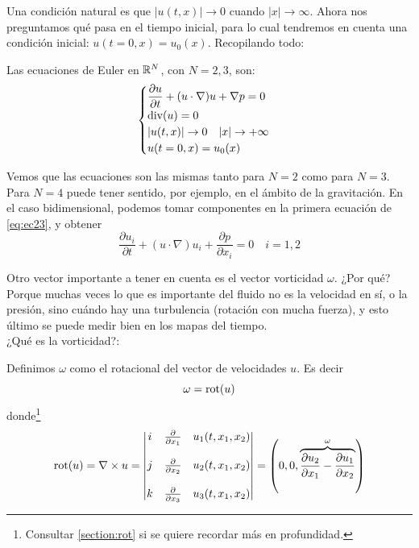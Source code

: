 Una condición natural es que $|u(t,x)| \to 0$ cuando $|x| \to \infty$. Ahora nos preguntamos qué pasa en el tiempo inicial, para lo cual
tendremos en cuenta una condición inicial: $u(t=0,x) = u_0(x)$. Recopilando todo:

\begin{definicion}
    Las ecuaciones de Euler en $\mathbb{R}^N$, con $N=2,3$, son:
    \begin{equation}\label{eq:ec23}
        \begin{cases}
            \dfrac{\partial u}{\partial t} + (u \cdot \nabla) u + \nabla p = 0 \\
            \text{div}(u) = 0 \\
            |u(t,x)| \to 0 \quad |x| \to +\infty \\
            u(t=0,x) = u_0(x)
        \end{cases}
    \end{equation}
\end{definicion}

\begin{observacion}
    Vemos que las ecuaciones son las mismas tanto para $N=2$ como para $N=3$. Para $N=4$ puede tener sentido, por ejemplo, en el ámbito de la gravitación.
    En el caso bidimensional, podemos tomar componentes en la primera ecuación de \eqref{eq:ec23}, y obtener
    \begin{equation}
        \dfrac{\partial u_i}{\partial t} + (u \cdot \nabla) u_i + \dfrac{\partial p}{\partial x_i} = 0 \quad i=1,2
    \end{equation}
\end{observacion}

Otro vector importante a tener en cuenta es el vector vorticidad $\omega$. ¿Por qué? Porque muchas veces lo que es importante del fluido 
no es la velocidad en sí, o la presión, sino cuándo hay una turbulencia (rotación con mucha fuerza), y esto último se puede medir bien en los 
mapas del tiempo. \\

¿Qué es la vorticidad?:

\begin{definicion}[Vorticidad]
    Definimos $\omega$ como el rotacional del vector de velocidades $u$. Es decir
    $$\omega = \text{rot}(u)$$
    donde\footnote{Consultar \ref{section:rot} si se quiere recordar más en profundidad.} 
    $$\text{rot}(u) = \nabla \times u = \begin{vmatrix}
        i & \frac{\partial}{\partial x_1} & u_1(t, x_1, x_2) \\\\
        j & \frac{\partial}{\partial x_2} & u_2(t, x_1, x_2) \\\\
        k & \frac{\partial}{\partial x_3} & u_3(t, x_1, x_2)
    \end{vmatrix} = \left(0, 0, \overbrace{\dfrac{\partial u_2}{\partial x_1} - \dfrac{\partial u_1}{\partial x_2}}^{\omega} \right)$$
\end{definicion}


